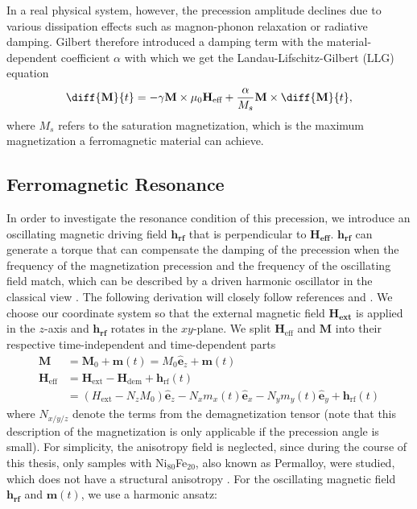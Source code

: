 In a real physical system, however, the precession amplitude declines due to various dissipation effects such as magnon-phonon relaxation or radiative damping. Gilbert therefore introduced a damping term with the material-dependent coefficient $\alpha$ with which we get the Landau-Lifschitz-Gilbert (LLG) equation \cite{Liensberger2021}
\begin{equation}
    \diff{\textbf{M}}{t} = - \gamma \textbf{M} \times \mu_0 \mathbf{{H_{\text{eff}}}} + \frac{\alpha}{M_s}\mathbf{M} \times\diff{\textbf{M}}{t},
\end{equation}
where $M_s$ refers to the saturation magnetization, which is the maximum magnetization a ferromagnetic material can achieve.

\subsection{Ferromagnetic Resonance}
In order to investigate the resonance condition of this precession, we introduce an oscillating magnetic driving field $\mathbf{h_{\text{rf}}}$ that is perpendicular to $\mathbf{{H_{\text{eff}}}}$. $\mathbf{h_{\text{rf}}}$ can generate a torque that can compensate the damping of the precession when the frequency of the magnetization precession and the frequency of the oscillating field match, which can be described by a driven harmonic oscillator in the classical view \cite{Liensberger2021}.
The following derivation will closely follow references \cite{Liensberger2017} and \cite{Mueller2019}. We choose our coordinate system so that the external magnetic field $\mathbf{{H_{\text{ext}}}}$ is applied in the $z$-axis and $\mathbf{h_{\text{rf}}}$ rotates in the $xy$-plane. We split $\textbf{H}_\textrm{eff}$ and $\textbf{M}$ into their respective time-independent and time-dependent parts 
\begin{equation}
    \begin{aligned}
        \mathbf{M} &= \mathbf{M}_0 + \mathbf{m}(t) = M_0 \mathbf{\hat{e}}_z + \mathbf{m}(t) \\
        \mathbf{H}_{\text{eff}} &= \mathbf{H}_{\text{ext}} - \mathbf{H}_{\text{dem}} + \mathbf{h}_{\text{rf}}(t) \\
        &= (H_{\text{ext}} - N_z M_0) \mathbf{\hat{e}}_z - N_x m_x(t) \mathbf{\hat{e}}_x - N_y m_y(t) \mathbf{\hat{e}}_y + \mathbf{h}_{\text{rf}}(t) 
    \end{aligned}
    \label{time-dependent and independent}
\end{equation}
where $N_{x/y/z}$ denote the terms from the demagnetization tensor (note that this description of the magnetization is only applicable if the precession angle is small). For simplicity, the anisotropy field is neglected, since during the course of this thesis, only samples with Ni$_{80}$Fe$_{20}$, also known as Permalloy, were studied, which does not have a structural anisotropy \cite{Decker_2017}. For the oscillating magnetic field $\mathbf{h_{\text{rf}}}$ and $\textbf{m}(t)$, we use a harmonic ansatz:
